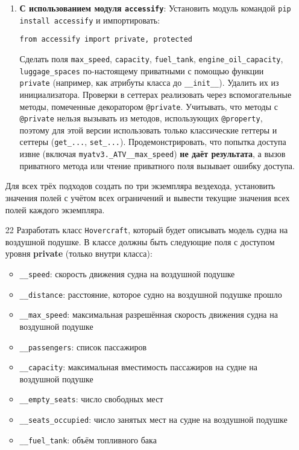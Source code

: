 \begin{enumerate}
\begin{enumerate}
    \item \textbf{С использованием модуля \texttt{accessify}}:  
    Установить модуль командой \texttt{pip install accessify} и импортировать:  
    \begin{verbatim}
from accessify import private, protected
    \end{verbatim}  
    Сделать поля \texttt{max\_speed}, \texttt{capacity}, \texttt{fuel\_tank}, \texttt{engine\_oil\_capacity}, \texttt{luggage\_spaces} по-настоящему приватными с помощью функции \texttt{private} (например, как атрибуты класса до \texttt{\_\_init\_\_}). Удалить их из инициализатора.  
    Проверки в сеттерах реализовать через вспомогательные методы, помеченные декоратором \texttt{@private}.  
    Учитывать, что методы с \texttt{@private} нельзя вызывать из методов, использующих \texttt{@property}, поэтому для этой версии использовать только классические геттеры и сеттеры (\texttt{get\_...}, \texttt{set\_...}).  
    Продемонстрировать, что попытка доступа извне (включая \texttt{myatv3.\_ATV\_\_max\_speed}) \textbf{не даёт результата}, а вызов приватного метода или чтение приватного поля вызывает ошибку доступа.
\end{enumerate}
Для всех трёх подходов создать по три экземпляра вездехода, установить значения полей с учётом всех ограничений и вывести текущие значения всех полей каждого экземпляра.
\item[22] Разработать класс \texttt{Hovercraft}, который будет описывать модель судна на воздушной подушке. В классе должны быть следующие поля с доступом уровня \textbf{private} (только внутри класса):
\begin{itemize}
    \item \texttt{\_\_speed}: скорость движения судна на воздушной подушке  
    \item \texttt{\_\_distance}: расстояние, которое судно на воздушной подушке прошло  
    \item \texttt{\_\_max\_speed}: максимальная разрешённая скорость движения судна на воздушной подушке  
    \item \texttt{\_\_passengers}: список пассажиров  
    \item \texttt{\_\_capacity}: максимальная вместимость пассажиров на судне на воздушной подушке  
    \item \texttt{\_\_empty\_seats}: число свободных мест  
    \item \texttt{\_\_seats\_occupied}: число занятых мест на судне на воздушной подушке  
    \item \texttt{\_\_fuel\_tank}: объём топливного бака  

\end{itemize}
\end{enumerate}
